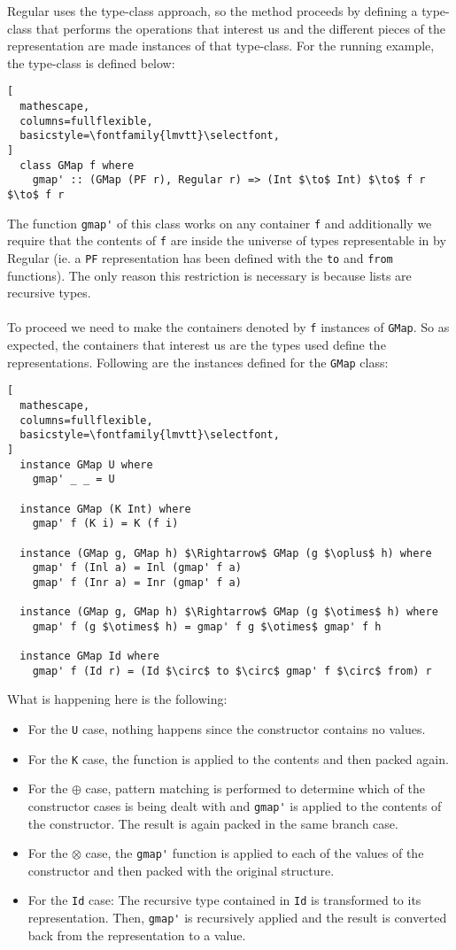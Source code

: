 \documentclass[8pt]{extarticle}
\begin{document}
Regular uses the type-class approach, so the method proceeds by defining a type-class that performs the operations that interest us and the different pieces of the representation are made instances of that type-class. For the running example, the type-class is defined below:
\begin{lstlisting}[
  mathescape,
  columns=fullflexible,
  basicstyle=\fontfamily{lmvtt}\selectfont,
]
  class GMap f where
    gmap' :: (GMap (PF r), Regular r) => (Int $\to$ Int) $\to$ f r $\to$ f r
\end{lstlisting}
The function \verb+gmap'+ of this class works on any container \verb+f+ and additionally we require that the contents of \verb+f+ are inside the universe of types representable in by Regular (ie. a \verb+PF+ representation has been defined with the \verb+to+ and \verb+from+ functions). The only reason this restriction is necessary is because lists are recursive types.
\\\\
To proceed we need to make the containers denoted by \verb+f+ instances of \verb+GMap+. So as expected, the containers that interest us are the types used define the representations. Following are the instances defined for the \verb+GMap+ class:
\begin{lstlisting}[
  mathescape,
  columns=fullflexible,
  basicstyle=\fontfamily{lmvtt}\selectfont,
]
  instance GMap U where
    gmap' _ _ = U

  instance GMap (K Int) where
    gmap' f (K i) = K (f i)

  instance (GMap g, GMap h) $\Rightarrow$ GMap (g $\oplus$ h) where
    gmap' f (Inl a) = Inl (gmap' f a)
    gmap' f (Inr a) = Inr (gmap' f a)

  instance (GMap g, GMap h) $\Rightarrow$ GMap (g $\otimes$ h) where
    gmap' f (g $\otimes$ h) = gmap' f g $\otimes$ gmap' f h

  instance GMap Id where
    gmap' f (Id r) = (Id $\circ$ to $\circ$ gmap' f $\circ$ from) r
\end{lstlisting}
What is happening here is the following:
\begin{itemize}
\item For the \verb+U+ case, nothing happens since the constructor contains no values.
\item For the \verb+K+ case, the function is applied to the contents and then packed again.
\item For the $\oplus$ case, pattern matching is performed to determine which of the constructor cases is being dealt with and \verb+gmap'+ is applied to the contents of the constructor. The result is again packed in the same branch case.
\item For the $\otimes$ case, the \verb+gmap'+ function is applied to each of the values of the constructor and then packed with the original structure.
\item For the \verb+Id+ case: The recursive type contained in \verb+Id+ is transformed to its representation. Then, \verb+gmap'+ is recursively applied and the result is converted back from the representation to a value.
\end{itemize}
\end{document}
